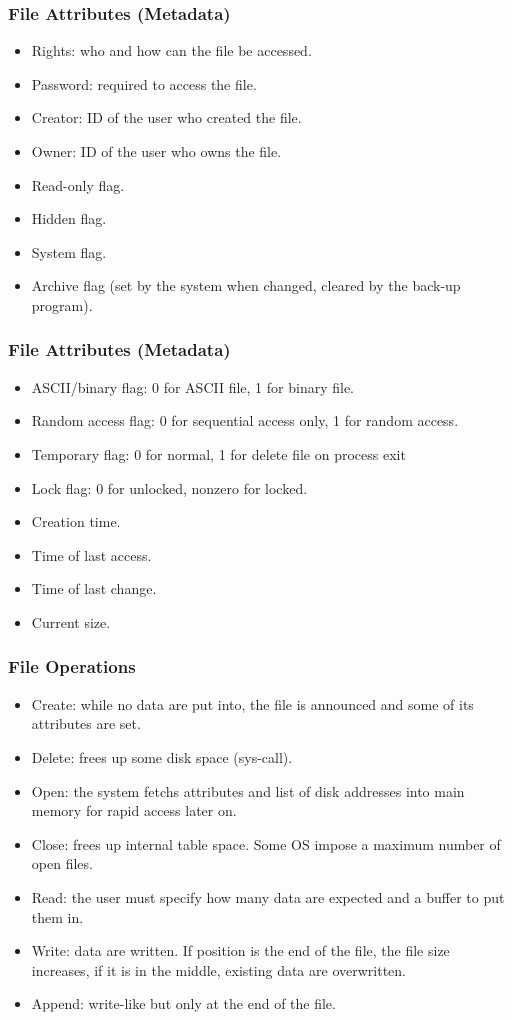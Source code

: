\begin{frame}
    \frametitle{File Attributes (Metadata)}
    \begin{itemize}
      \item Rights: who and how can the file be accessed.
      \item Password: required to access the file.
      \item Creator: ID of the user who created the file.
      \item Owner: ID of the user who owns the file.
      \item Read-only flag.
      \item Hidden flag.
      \item System flag.
      \item Archive flag (set by the system when changed, cleared by the back-up program).
    \end{itemize}
\end{frame}

\begin{frame}
    \frametitle{File Attributes (Metadata)}
    \begin{itemize}
      \item ASCII/binary flag: 0 for ASCII file, 1 for binary file.
      \item Random access flag: 0 for sequential access only, 1 for random access.
      \item Temporary flag: 0 for normal, 1 for delete file on process exit
      \item Lock flag: 0 for unlocked, nonzero for locked.
      \item Creation time.
      \item Time of last access.
      \item Time of last change.
      \item Current size.
\end{itemize}
\end{frame}

\begin{frame}
  \frametitle{File Operations}
    \begin{itemize}
      \item Create: while no data are put into, the file is announced and some of its attributes are set.
      \item Delete: frees up some disk space (sys-call).
      \item Open: the system fetchs attributes and list of disk addresses into main memory for rapid access later on.
      \item Close: frees up internal table space. Some OS impose a maximum number of open files.
      \item Read: the user must specify how many data are expected and a buffer to put them in.
      \item Write: data are written. If position is the end of the file, the file size increases, if it is in the middle, existing data are overwritten.
      \item Append: write-like but only at the end of the file.
    \end{itemize}
\end{frame}


